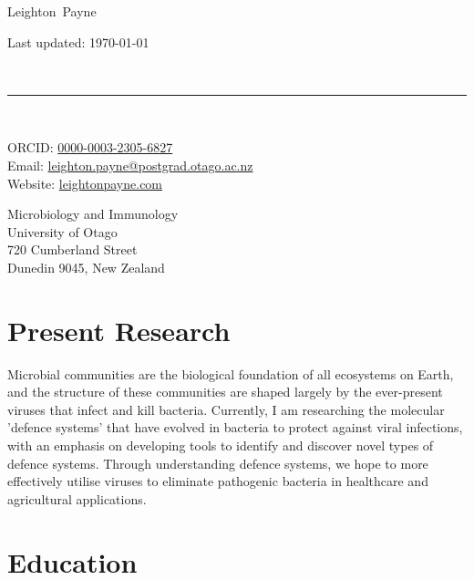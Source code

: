 \documentclass[10pt, a4paper]{article} %
\makeatletter
\newcommand{\FirstName}{Leighton}
\newcommand{\LastName}{Payne}
\newcommand{\MyName}{\FirstName\ \LastName}
\newcommand{\Email}{leighton.payne@postgrad.otago.ac.nz}
\newcommand{\PersonalWebsite}{leightonpayne.com}
\newcommand{\ORCID}{0000-0003-2305-6827}
\newcommand{\UOO}{University of Otago}
\newcommand{\Company}{\UOO}
\newcommand{\Department}{Microbiology and Immunology}
\newcommand{\Address}{720 Cumberland Street \\ Dunedin 9045, New Zealand}
\newcommand{\Affiliation}{\Department \\ \Company \\ \Address}
\newcommand{\Website}[1]{\href{https://#1}{#1}}
\makeatother
\begin{document}
\thispagestyle{empty}


\begin{minipage}[t]{0.7\textwidth}
{\fontsize{22pt}{0}\selectfont\MyName}
\end{minipage}
\begin{minipage}[t]{0.3\textwidth}
  \begin{flushright}
    Last updated: \monthyear\today
  \end{flushright}
\end{minipage}
\\[-0.1cm]
\rule{\textwidth}{2pt}
\\[0.1cm]
\begin{minipage}[t]{0.7\textwidth}
    ORCID: \href{https://orcid.org/\ORCID}{\ORCID}
    \\
    Email: \href{mailto:\Email}{\Email}
    \\
    Website: \Website{\PersonalWebsite}
\end{minipage}
\begin{minipage}[t]{0.3\textwidth}
  \begin{flushright}
    \Affiliation
  \end{flushright}
\end{minipage}


\section{Present Research}

Microbial communities are the biological foundation of all ecosystems on Earth, and the structure of these communities are shaped largely by the ever-present viruses that infect and kill bacteria. Currently, I am researching the molecular 'defence systems' that have evolved in bacteria to protect against viral infections, with an emphasis on developing tools to identify and discover novel types of defence systems. Through understanding defence systems, we hope to more effectively utilise viruses to eliminate pathogenic bacteria in healthcare and agricultural applications.

\needspace{12em}
\section{Education}
\end{document}
